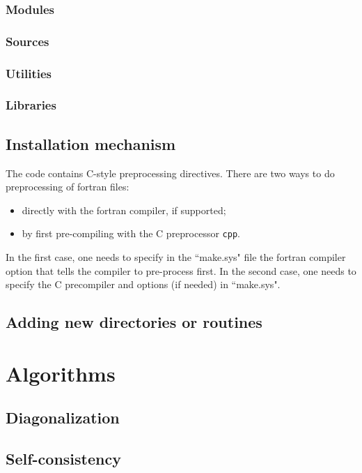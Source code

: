 \documentclass[12pt,a4paper]{article}
\begin{document}
\subsubsection{Modules}

\subsubsection{Sources}

\subsubsection{Utilities}

\subsubsection{Libraries}

\subsection{Installation mechanism}

The code contains C-style preprocessing directives. 
There are two ways to do preprocessing of fortran files:
\begin{itemize}
  \item directly with the fortran compiler, if supported;
  \item by first pre-compiling with the C preprocessor {\tt cpp}.
\end{itemize}
In the first case, one needs to specify in the ``make.sys" file the
fortran compiler option that tells the compiler 
to pre-process first. In the second case, one needs to 
specify the C precompiler and options (if needed) in ``make.sys".

\subsection{Adding new directories or routines}

\section{Algorithms}

\subsection{Diagonalization}

\subsection{Self-consistency}
\end{document}

